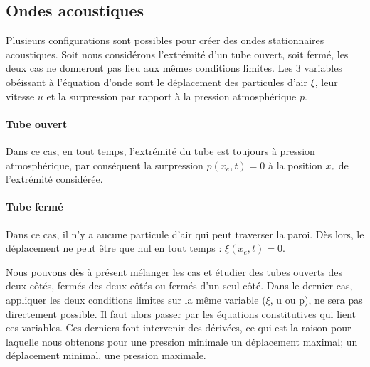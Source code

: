 \subsection{Ondes acoustiques}
Plusieurs configurations sont possibles pour créer des ondes stationnaires acoustiques. Soit nous considérons l'extrémité d'un tube ouvert, soit fermé, les deux cas ne donneront pas lieu aux mêmes conditions limites. Les 3 variables obéissant à l'équation d'onde sont le déplacement des particules d'air $\xi$, leur vitesse $u$ et la surpression par rapport à la pression atmosphérique $p$. 
\paragraph{Tube ouvert}
Dans ce cas, en tout temps, l'extrémité du tube est toujours à pression atmosphérique, par conséquent la surpression $p(x_e,t)=0$ à la position $x_e$ de l'extrémité considérée. 
\paragraph{Tube fermé}
Dans ce cas, il n'y a aucune particule d'air qui peut traverser la paroi. Dès lors, le déplacement ne peut être que nul en tout temps : $\xi(x_e,t)=0$.

\par Nous pouvons dès à présent mélanger les cas et étudier des tubes ouverts des deux côtés, fermés des deux côtés ou fermés d'un seul côté. Dans le dernier cas, appliquer les deux conditions limites sur la même variable ($\xi$, u ou p), ne sera pas directement possible. Il faut alors passer par les équations constitutives qui lient ces variables. Ces derniers font intervenir des dérivées, ce qui est la raison pour laquelle nous obtenons pour une pression minimale un déplacement maximal; un déplacement minimal, une pression maximale. 

